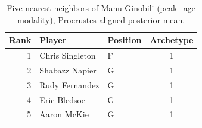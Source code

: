 \begin{table}[htbp]
  \centering\small
  \begin{tabular}{rllc}
    \toprule
    Rank & Player & Position & Archetype \\
    \midrule
    1 & Chris Singleton & F & 1 \\
    2 & Shabazz Napier & G & 1 \\
    3 & Rudy Fernandez & G & 1 \\
    4 & Eric Bledsoe & G & 1 \\
    5 & Aaron McKie & G & 1 \\
    \bottomrule
  \end{tabular}
  \caption{Five nearest neighbors of Manu Ginobili (peak_age modality), Procrustes-aligned posterior mean.}
  \label{tab:Manu_Ginobili_neighbors_peak_age}
\end{table}

